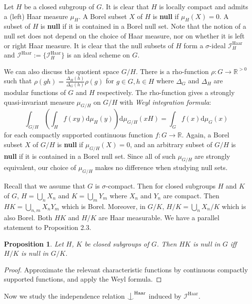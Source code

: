 \documentclass{article}
\newtheorem{prop}[definition]{Proposition}
\newcommand{\R}{\mathbb{R}}
\newcommand{\I}{\mathcal{I}}
\newcommand{\HH}{\mathrm{Haar}}
\newcommand{\dd}{\mathrm{d}}
\newcommand{\ind}{\mathrel{\raise0.2ex\hbox{\ooalign{\hidewidth$\vert$\hidewidth\cr\raise-0.9ex\hbox{$\smile$}}}}}
\begin{document}
Let $H$ be a closed subgroup of $G$. It is clear that $H$ is locally compact and admits a (left) Haar measure $\mu_H$. A Borel subset $X$ of $H$ is \textbf{null} if $\mu_H(X)=0$. A subset of $H$ is \textbf{null} if it is contained in a Borel null set. Note that the notion of a null set does not depend on the choice of Haar measure, nor on whether it is left or right Haar measure.
It is clear that the null subsets of $H$ form a $\sigma$-ideal $\I^\HH_H$ and $\I^\HH:=\{\I_H^\HH\}$ is an ideal scheme on $G$.


We can also discuss the quotient space $G/H$.
There is a rho-function $\rho:G\rightarrow \R^{>0}$  such that $\rho(gh)=\frac{\Delta_H(h)}{\Delta_G(h)}\rho(g)$ for $g\in G,h\in H$ where $\Delta_G$ and $\Delta_H$ are modular functions of $G$ and $H$ respectively. The rho-function gives a strongly quasi-invariant measure $\mu_{G/H}$ on $G/H$ with \textit{Weyl integration formula}: 
$$\int_{G/H} (\int_H f(xy) \dd \mu_H( y)) \dd \mu_{G/H}(xH)=\int_G f(x) \dd \mu_G(x)$$
for each compactly supported continuous function $f:G\rightarrow \R$. Again, a Borel subset $X$ of $G/H$ is \textbf{null} if $\mu_{G/H}(X)=0$, and an arbitrary subset of $G/H$ is \textbf{null} if it is contained in a Borel null set. Since all of such $\mu_{G/H}$ are strongly equivalent, our choice of $\mu_{G/H}$ makes no difference when studying null sets.

Recall that we assume that $G$ is $\sigma$-compact. Then for closed subgroups $H$ and $K$ of $G$,  $H=\bigcup_n X_n$ and $K=\bigcup_m Y_m$ where $X_n$ and $Y_n$ are compact. Then $HK=\bigcup_{n,m} X_n Y_m$ which is Borel. Moreover, in $G/K$, $H/K=\bigcup_n X_n/K$ which is also Borel. Both $HK$ and $H/K$ are Haar measurable. We have a parallel statement to \cite{KP} Proposition 2.3.

\begin{prop}\label{q-lemma}
Let $H$, $K$ be closed subgroups of $G$. Then $HK$ is null in $G$ iff $H/K$ is null in $G/K$.
\end{prop}
\begin{proof}
Approximate the relevant characteristic functions by continuous compactly supported functions, and apply the Weyl formula.
\end{proof}

Now we study the independence relation $\ind^\HH$ induced by $\I^\HH$. 
\end{document}
